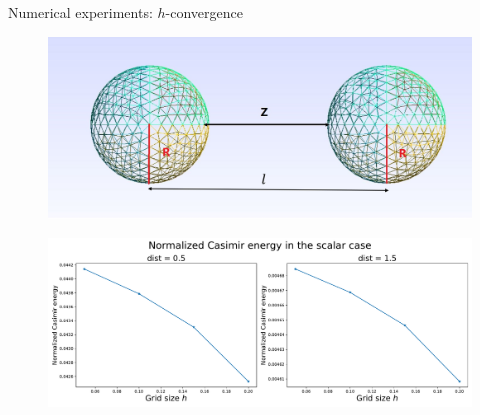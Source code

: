 \documentclass[dvipsnames,10pt]{beamer}
\begin{document}
\begin{frame}{Numerical experiments: $h$-convergence}
\vspace{.3cm}
\begin{figure}
    \centering
    \includegraphics[scale = 0.2]{figs/Picture1.png}
\end{figure}
\begin{figure}
    \centering
    \includegraphics[scale = 0.3]{figs/CasE_scalar.pdf}
\end{figure}
    
\end{frame}
\end{document}
